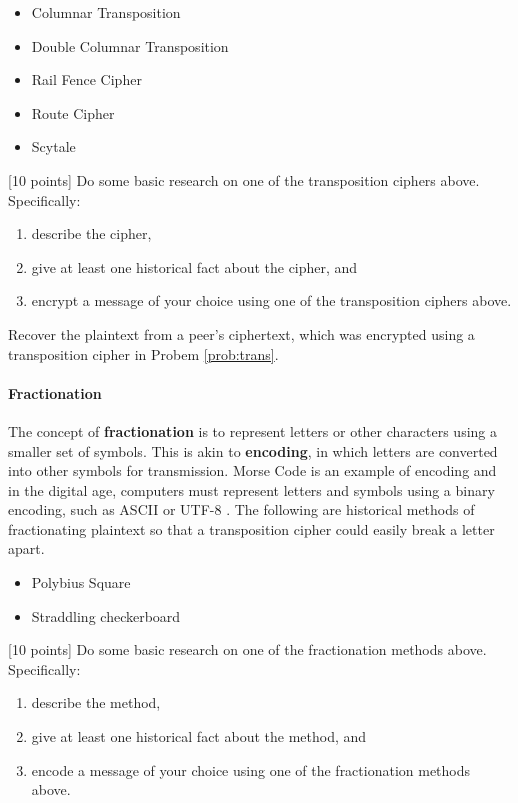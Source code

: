 		\begin{itemize}
			\item Columnar Transposition
			\item Double Columnar Transposition
			\item Rail Fence Cipher
			\item Route Cipher
			\item Scytale
		\end{itemize}

\begin{problem}
\label{prob:trans} [10 points]
Do some basic research on one of the transposition ciphers above. Specifically:
\begin{enumerate}
   \item describe the cipher,
   \item give at least one historical fact about the cipher, and
   \item encrypt a message of your choice using one of the transposition ciphers above.
\end{enumerate}
\end{problem}

\begin{problem} [15 points]
Recover the plaintext from a peer's ciphertext, which was encrypted using a transposition cipher in Probem \ref{prob:trans}.
\end{problem}

	\paragraph*{Fractionation} The concept of {\bf fractionation}  is to represent letters or other characters using a smaller set of symbols. This is akin to {\bf encoding},  in which letters are converted into other symbols for transmission. Morse Code is an example of encoding and in the digital age, computers must represent letters and symbols using a binary encoding, such as ASCII  or UTF-8 . The following are historical methods of fractionating plaintext so that a transposition cipher  could easily break a letter apart.

		\begin{itemize}
			\item Polybius Square
			\item Straddling checkerboard
		\end{itemize}

\begin{problem}
\label{prob:frac} [10 points]
Do some basic research on one of the fractionation methods above. Specifically:
\begin{enumerate}
   \item describe the method,
   \item give at least one historical fact about the method, and
   \item encode a message of your choice using one of the fractionation methods above.
\end{enumerate}
\end{problem}

